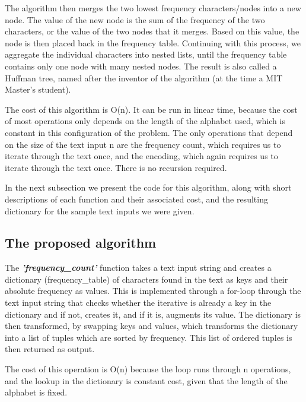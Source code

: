 \documentclass[11pt]{article}
\begin{document}
The algorithm then merges the two lowest frequency characters/nodes into
a new node. The value of the new node is the sum of the frequency of the
two characters, or the value of the two nodes that it merges. Based on
this value, the node is then placed back in the frequency table.
Continuing with this process, we aggregate the individual characters
into nested lists, until the frequency table contains only one node with
many nested nodes. The result is also called a Huffman tree, named after
the inventor of the algorithm (at the time a MIT Master's student).

The cost of this algorithm is O(n). It can be run in linear time,
because the cost of most operations only depends on the length of the
alphabet used, which is constant in this configuration of the problem.
The only operations that depend on the size of the text input n are the
frequency count, which requires us to iterate through the text once, and
the encoding, which again requires us to iterate through the text once.
There is no recursion required.

In the next subsection we present the code for this algorithm, along
with short descriptions of each function and their associated cost, and
the resulting dictionary for the sample text inputs we were given.

    \subsection{The proposed algorithm}\label{the-proposed-algorithm}

    The \textbf{\emph{'frequency\_count'}} function takes a text input
string and creates a dictionary (frequency\_table) of characters found
in the text as keys and their absolute frequency as values. This is
implemented through a for-loop through the text input string that checks
whether the iterative is already a key in the dictionary and if not,
creates it, and if it is, augments its value. The dictionary is then
transformed, by swapping keys and values, which transforms the
dictionary into a list of tuples which are sorted by frequency. This
list of ordered tuples is then returned as output.

The cost of this operation is O(n) because the loop runs through n
operations, and the lookup in the dictionary is constant cost, given
that the length of the alphabet is fixed.
\end{document}
